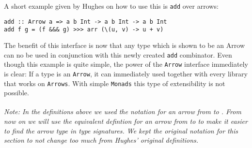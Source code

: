 A short example given by Hughes on how to use this is \lstinline{add} over arrows:
\begin{lstlisting}[frame=htrbl]
add :: Arrow a => a b Int -> a b Int -> a b Int
add f g = (f &&& g) >>> arr (\(u, v) -> u + v)
\end{lstlisting}
The benefit of this interface is now that any type which is shown to be an Arrow can no be used in conjunction with this newly created \lstinline{add} combinator. Even though this example is quite simple, the power of the \lstinline{Arrow} interface immediately is clear: If a type is an \lstinline{Arrow}, it can immediately used together with every library that works on \lstinline{Arrows}. With simple \lstinline{Monads} this type of extensibility is not possible.
\\\\
\textit{Note: In the definitions above we used the notation  for an arrow from  to . From now on we will use the equivalent defintion  for an arrow from  to  to make it easier to find the arrow type in type signatures. We kept the original notation  for this section to not change too much from Hughes' original definitions.}